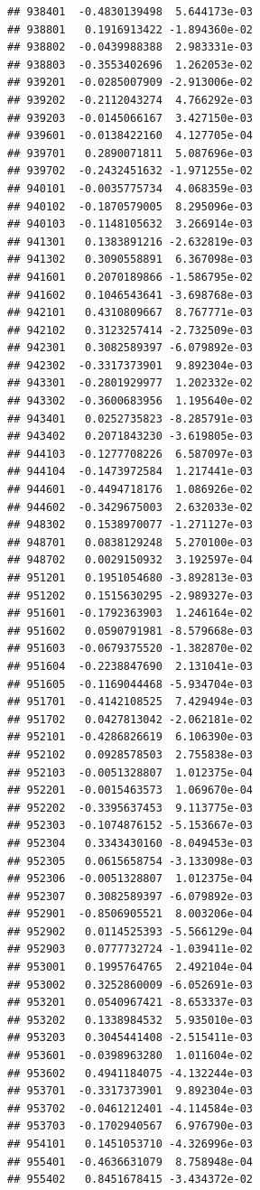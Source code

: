 \documentclass[ignorenonframetext,]{beamer}
\begin{document}
\begin{frame}[fragile]
\begin{verbatim}
## 938401  -0.4830139498  5.644173e-03
## 938801   0.1916913422 -1.894360e-02
## 938802  -0.0439988388  2.983331e-03
## 938803  -0.3553402696  1.262053e-02
## 939201  -0.0285007909 -2.913006e-02
## 939202  -0.2112043274  4.766292e-03
## 939203  -0.0145066167  3.427150e-03
## 939601  -0.0138422160  4.127705e-04
## 939701   0.2890071811  5.087696e-03
## 939702  -0.2432451632 -1.971255e-02
## 940101  -0.0035775734  4.068359e-03
## 940102  -0.1870579005  8.295096e-03
## 940103  -0.1148105632  3.266914e-03
## 941301   0.1383891216 -2.632819e-03
## 941302   0.3090558891  6.367098e-03
## 941601   0.2070189866 -1.586795e-02
## 941602   0.1046543641 -3.698768e-03
## 942101   0.4310809667  8.767771e-03
## 942102   0.3123257414 -2.732509e-03
## 942301   0.3082589397 -6.079892e-03
## 942302  -0.3317373901  9.892304e-03
## 943301  -0.2801929977  1.202332e-02
## 943302  -0.3600683956  1.195640e-02
## 943401   0.0252735823 -8.285791e-03
## 943402   0.2071843230 -3.619805e-03
## 944103  -0.1277708226  6.587097e-03
## 944104  -0.1473972584  1.217441e-03
## 944601  -0.4494718176  1.086926e-02
## 944602  -0.3429675003  2.632033e-02
## 948302   0.1538970077 -1.271127e-03
## 948701   0.0838129248  5.270100e-03
## 948702   0.0029150932  3.192597e-04
## 951201   0.1951054680 -3.892813e-03
## 951202   0.1515630295 -2.989327e-03
## 951601  -0.1792363903  1.246164e-02
## 951602   0.0590791981 -8.579668e-03
## 951603  -0.0679375520 -1.382870e-02
## 951604  -0.2238847690  2.131041e-03
## 951605  -0.1169044468 -5.934704e-03
## 951701  -0.4142108525  7.429494e-03
## 951702   0.0427813042 -2.062181e-02
## 952101  -0.4286826619  6.106390e-03
## 952102   0.0928578503  2.755838e-03
## 952103  -0.0051328807  1.012375e-04
## 952201  -0.0015463573  1.069670e-04
## 952202  -0.3395637453  9.113775e-03
## 952303  -0.1074876152 -5.153667e-03
## 952304   0.3343430160 -8.049453e-03
## 952305   0.0615658754 -3.133098e-03
## 952306  -0.0051328807  1.012375e-04
## 952307   0.3082589397 -6.079892e-03
## 952901  -0.8506905521  8.003206e-04
## 952902   0.0114525393 -5.566129e-04
## 952903   0.0777732724 -1.039411e-02
## 953001   0.1995764765  2.492104e-04
## 953002   0.3252860009 -6.052691e-03
## 953201   0.0540967421 -8.653337e-03
## 953202   0.1338984532  5.935010e-03
## 953203   0.3045441408 -2.515411e-03
## 953601  -0.0398963280  1.011604e-02
## 953602   0.4941184075 -4.132244e-03
## 953701  -0.3317373901  9.892304e-03
## 953702  -0.0461212401 -4.114584e-03
## 953703  -0.1702940567  6.976790e-03
## 954101   0.1451053710 -4.326996e-03
## 955401  -0.4636631079  8.758948e-04
## 955402   0.8451678415 -3.434372e-02

\end{verbatim}
\end{frame}
\end{document}
